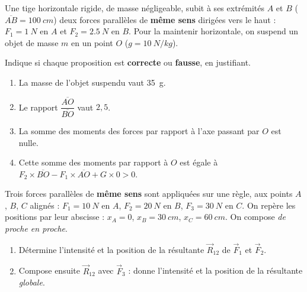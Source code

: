 \documentclass[11pt,a4paper]{article}
\newcommand{\vv}[1]{\vec{#1}}\newcommand{\ds}{\displaystyle}
\begin{document}
\begin{exo}
Une tige horizontale rigide, de masse négligeable, subit à ses extrémités $A$ et $B$
($\overline{AB}=\qty{100}{cm}$) deux forces parallèles de \textbf{même sens} dirigées vers le haut :
$F_1=\qty{1}{N}$ en $A$ et $F_2=\qty{2.5}{N}$ en $B$. Pour la maintenir horizontale, on suspend un
objet de masse $m$ en un point $O$ ($g=\qty{10}{N/kg}$).
\begin{center}
\end{center}
Indique si chaque proposition est \textbf{correcte} ou \textbf{fausse}, en justifiant.
\begin{enumerate}[label=\alph*)]
  \item La masse de l'objet suspendu vaut \qty{35}{g}.
  \item Le rapport $\dfrac{\overline{AO}}{\overline{BO}}$ vaut $2{,}5$.
  \item La somme des moments des forces par rapport à l'axe passant par $O$ est nulle.
  \item Cette somme des moments par rapport à $O$ est égale à
        $F_2\times\overline{BO} - F_1\times\overline{AO} + G\times 0 > 0$.
\end{enumerate}
\end{exo}

\begin{exo}
Trois forces parallèles de \textbf{même sens} sont appliquées sur une règle, aux points $A$, $B$, $C$
alignés : $F_1=\qty{10}{N}$ en $A$, $F_2=\qty{20}{N}$ en $B$, $F_3=\qty{30}{N}$ en $C$. On repère les
positions par leur abscisse : $x_A=0$, $x_B=\qty{30}{cm}$, $x_C=\qty{60}{cm}$. On compose
\emph{de proche en proche}.
\begin{enumerate}[label=\alph*)]
  \item Détermine l'intensité et la position de la résultante $\vv R_{12}$ de $\vv F_1$ et $\vv F_2$.
  \item Compose ensuite $\vv R_{12}$ avec $\vv F_3$ : donne l'intensité et la position de la
        résultante \emph{globale}.
\end{enumerate}
\end{exo}
\end{document}

